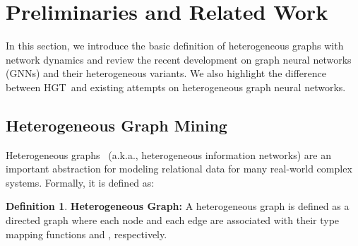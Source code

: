 \documentclass[sigconf]{acmart}
\theoremstyle{definition}
\newtheorem{defn}[theorem]{Definition}
\newcommand{\short}{HGT}
\begin{document}
\begin{comment}
For graph heterogeneity, We use the meta relation triplet of graph schema to define interaction and transform matrices, so that the model can capture both the common and specific patterns of different relationships using equal or even smaller parameters. In this way, the nodes in different types are allowed to maintain in their specific representation distribution, while connected nodes in different types can still interact and transform messages without being restricted by distribution gap.


For the graph dynamic without losing structure information, we first define a dynamic timestamp schema, under which the graph reserves all the edges happening in different times. Then we propose a relative temporal encoding to incorporate temporal information into HGT using limited computational resources. By end-to-end training, the model can automatically learn the temporal dependency and differences, 



In addition to the model architecture, training GNN for large-scale graph is also a significant challenge. The vanilla GCN has to calculate all the node representation in the graph, which is infeasible for web-scale graph data. To alleviate with it, researchers have proposed different sampling methods to conduct mini-batch training~\cite{graphsage,fastgcn,DBLP:conf/icml/ChenZS18,ladies}. However, all these sampling methods are designed for homogeneous graphs, and there has not been any work to conduct large-scale training for heterogeneous graphs. We therefore design a heterogeneous layer-dependent sub-graph sampling algorithm, with which the model can train on arbitrary large graphs and can achieve good performance. 






\end{comment} 
\section{Preliminaries and Related Work}\label{sec:problem} 
In this section, we introduce the basic definition of heterogeneous graphs with network dynamics and review the recent development on graph neural networks (GNNs) and their heterogeneous variants. 
We also highlight the difference between \short \ and existing attempts on heterogeneous graph neural networks.


\subsection{Heterogeneous Graph Mining}
Heterogeneous graphs~\cite{Sun:BOOK2012} (a.k.a., heterogeneous information networks) are an important abstraction for modeling relational data for many real-world complex systems. Formally, it is defined as:
\theoremstyle{definition}
\begin{defn}{\textbf{Heterogeneous Graph:}}
A heterogeneous graph is defined as a directed graph  where each node  and each edge  are associated with their type mapping functions  and , respectively. 
\end{defn}
\end{document}
